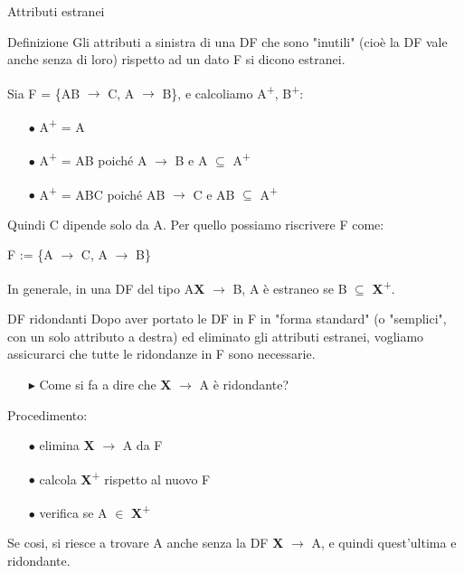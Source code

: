 \documentclass{beamer}
\begin{document}
\begin{frame}{Attributi estranei}
    \begin{block}{Definizione}
    Gli attributi a sinistra di una DF che sono "inutili" (cioè la DF vale anche senza di loro) rispetto ad un dato F si dicono estranei.
    \end{block}
    Sia F = \{AB $\rightarrow$ C, A $\rightarrow$ B\}, e calcoliamo A\textsuperscript{+}, B\textsuperscript{+}:\par
    \begin{itemize}
        \item[$\bullet$] A\textsuperscript{+} = A
        \item[$\bullet$] A\textsuperscript{+} = AB poiché A $\rightarrow$ B e A $\subseteq$ A\textsuperscript{+}
        \item[$\bullet$] A\textsuperscript{+} = ABC poiché AB $\rightarrow$ C e AB $\subseteq$ A\textsuperscript{+}
    \end{itemize}
    Quindi C dipende solo da A. Per quello possiamo riscrivere F come:\par
    \begin{center}
      F := \{A $\rightarrow$ C, A $\rightarrow$ B\}
    \end{center}
    \begin{block}{}
      In generale, in una DF del tipo A\textbf{X} $\rightarrow$ B, A è estraneo se B $\subseteq$ \textbf{X}\textsuperscript{+}.
    \end{block}
    
\end{frame}

\begin{frame}{DF ridondanti}
    Dopo aver portato le DF in F in "\textcolor{cadet}{forma standard}" (o "semplici", con un solo attributo a destra) ed \textcolor{cadet}{eliminato gli attributi estranei}, vogliamo assicurarci che tutte le ridondanze in F sono necessarie.
    \begin{itemize}
        \item[$\blacktriangleright$] Come si fa a dire che \textbf{X} $\rightarrow$ A è ridondante?
    \end{itemize}
    
    \vfill
    \begin{alertblock}{Procedimento:}
        \begin{itemize}
            \item[$\bullet$] elimina \textbf{X} $\rightarrow$ A da F
            \item[$\bullet$] calcola \textbf{X}\textsuperscript{+} rispetto al nuovo F
            \item[$\bullet$] verifica se A $\in$ \textbf{X}\textsuperscript{+}
        \end{itemize}
        Se cosi, si riesce a trovare A anche senza la DF \textbf{X} $\rightarrow$ A, e quindi quest'ultima e ridondante.
    \end{alertblock}
\end{frame}
\end{document}
